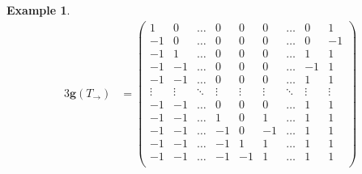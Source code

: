 \documentclass{amsart}
\theoremstyle{definition}
\newtheorem{example}[theorem]{Example}
\renewcommand{\b}[1]{{\boldsymbol{#1}}} %
\begin{document}
\begin{example}
\begin{table}[p]
\begin{alignat*}{3}
	\hat{\b{g}}(T_\rightarrow) & = \begin{pmatrix}
		1 & 0 & \dots & 0 & 0 & 0 & \dots & 0 & 1 \\
		-1 & 0 & \dots & 0 & 0 & 0 & \dots & 0 & -1 \\
		-1 & 1 & \dots & 0 & 0 & 0 & \dots & 1 & 1 \\
		-1 & -1 & \dots & 0 & 0 & 0 & \dots & -1 & 1 \\
		-1 & -1 & \dots & 0 & 0 & 0 & \dots & 1 & 1 \\
		\vdots & \vdots & \ddots & \vdots & \vdots & \vdots  & \ddots & \vdots & \vdots \\
		-1 & -1 & \dots & 0 & 0 & 0 & \dots & 1 & 1 \\
		-1 & -1 & \dots & 1 & 0 & 1 & \dots & 1 & 1 \\
		-1 & -1 & \dots & -1 & 0 & -1 & \dots & 1 & 1 \\
		-1 & -1 & \dots & -1 & 1 & 1 & \dots & 1 & 1 \\
		-1 & -1 & \dots & -1 & -1 & 1 & \dots & 1 & 1 \\
	\end{pmatrix}
	\end{alignat*}
	\endgroup
	\caption{The $\hat{\b{g}}$-matrices of the wiggly pseudotriangulations of \cref{exm:specialWigglyPseudotriangulations}. The $i$th column of~$\hat{\b{g}}(T)$ is the $\hat{\b{g}}$-vector~$\hat{\b{g}}(\alpha)$ of the $i$th wiggly arc~$\alpha$ of~$T$ (ordered from bottom to top). 
}
	\label{table:specialGMatrices}
\end{table}
\end{example}
\end{document}
